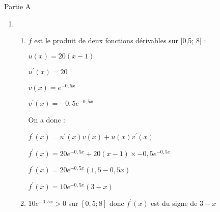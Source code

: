 \begin{corrige}
     \begin{h3}Partie A\end{h3}
     \begin{enumerate}
          \item
          \begin{enumerate}
               \item
               $f$ est le produit de deux fonctions dérivables sur [0,5; 8] :
               \par
               $u\left(x\right)=20\left(x-1\right)$
               \par
               $u^{\prime}\left(x\right)=20$
               \par
               $v\left(x\right)=e^{-0,5x}$
               \par
               $v^{\prime}\left(x\right)=-0,5e^{-0,5x}$
               \par
               On a donc :
               \par
               $f^{\prime}\left(x\right)=u^{\prime}\left(x\right)v\left(x\right)+u\left(x\right)v^{\prime}\left(x\right)$
               \par
               $f^{\prime}\left(x\right) = 20e^{-0,5x}+20\left(x-1\right)\times -0,5e^{-0,5x}$
               \par
               $f^{\prime}\left(x\right) = 20e^{-0,5x}\left(1,5-0,5x\right)$
               \par
               $f^{\prime}\left(x\right) = 10e^{-0,5x}\left(3-x\right)$
               \item
               $10e^{-0,5x} > 0$ sur $\left[0,5; 8\right]$ donc $f^{\prime}\left(x\right)$ est du signe de $3-x$
               \par


\end{enumerate}
\end{enumerate}
\end{corrige}
